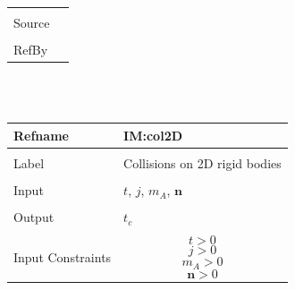 \documentclass[12pt]{article}
\begin{document}
\begin{minipage}{\textwidth}
\begin{tabular}{p{} p{}}
                                                                                                   \\ \midrule \\
                                                                                                   Source & \\ \midrule \\
                                                                                                            RefBy & 
\\ \bottomrule \end{tabular}
\end{minipage}\\
~\newline
 \noindent \begin{minipage}{\textwidth}
\begin{tabular}{p{} p{}}
\toprule \textbf{Refname} & \textbf{IM:col2D}
\label{IM:col2D}
\\ \midrule \\
Label & Collisions on 2D rigid bodies
        \\ \midrule \\
        Input & $t$, $j$, ${m_{A}}$, $\mathbf{n}$
                \\ \midrule \\
                Output & ${t_{c}}$
                         \\ \midrule \\
                         Input Constraints & \begin{displaymath}
                                             t>0
                                             \end{displaymath}
                                             \begin{displaymath}
                                             j>0
                                             \end{displaymath}
                                             \begin{displaymath}
                                             {m_{A}}>0
                                             \end{displaymath}
                                             \begin{displaymath}
                                             \mathbf{n}>0
                                             \end{displaymath}

\end{tabular}
\end{minipage}
\end{document}
